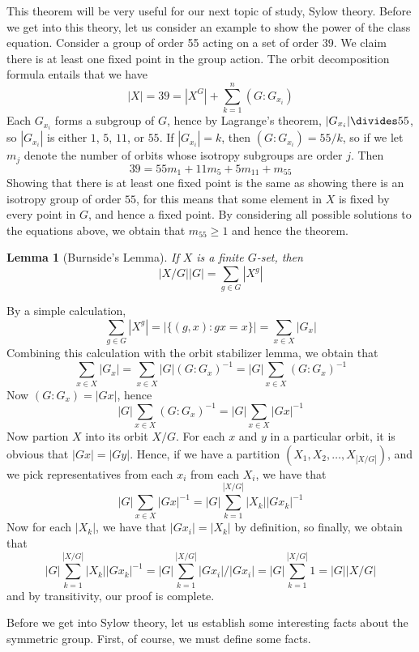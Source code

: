 \documentclass[12pt]{amsbook}
\makeatletter
\theoremstyle{plain}
\newtheorem{lemma}[theorem]{Lemma}
\theoremstyle{definition}
\renewenvironment{proof}[1][\proofname]{\par
  \pushQED{\qed}%
  \normalfont \topsep6\p@\@plus6\p@\relax
  \list{}{\leftmargin=0em
          \rightmargin=\leftmargin
          \settowidth{\itemindent}{\itshape#1}%
          \labelwidth=\itemindent}

  \item[\hskip\labelsep
        \itshape
    #1\@addpunct{.}]\ignorespaces
}{%
  \popQED\endlist\@endpefalse
}
\makeatother
\begin{document}
This theorem will be very useful for our next topic of study, Sylow theory. Before we get into this theory, let us consider an example to show the power of the class equation. Consider a group of order 55 acting on a set of order 39. We claim there is at least one fixed point in the group action. The orbit decomposition formula entails that we have
%
\[ |X| = 39 = |X^G| + \sum_{k=1}^n (G:G_{x_i}) \]
%
Each $G_{x_i}$ forms a subgroup of $G$, hence by Lagrange's theorem, $|G_{x_i}| \divides 55$, so $|G_{x_i}|$ is either $1$, $5$, $11$, or $55$. If $|G_{x_i}| = k$, then $(G:G_{x_i}) = 55/k$, so if we let $m_j$ denote the number of orbits whose isotropy subgroups are order $j$. Then
%
\[ 39 = 55m_1 + 11m_5 + 5m_{11} + m_{55} \]
%
Showing that there is at least one fixed point is the same as showing there is an isotropy group of order $55$, for this means that some element in $X$ is fixed by every point in $G$, and hence a fixed point. By considering all possible solutions to the equations above, we obtain that $m_{55} \geq 1$ and hence the theorem.

\begin{lemma}[Burnside's Lemma] 
    If $X$ is a finite $G$-set, then
    \[ |X/G||G| = \sum_{g \in G} |X^g| \]
\end{lemma}
\begin{proof}
    By a simple calculation,
    \[ \sum_{g \in G} |X^g| = |\{(g,x): gx = x\}| = \sum_{x \in X} |G_x| \]
    Combining this calculation with the orbit stabilizer lemma, we obtain that
    \[ \sum_{x \in X} |G_x| = \sum_{x \in X} |G|(G:G_x)^{-1} = |G| \sum_{x \in X} (G:G_x)^{-1} \]
    Now $(G:G_x) = |Gx|$, hence
    \[ |G| \sum_{x \in X} (G:G_x)^{-1} = |G| \sum_{x \in X} |Gx|^{-1} \]
    Now partion $X$ into its orbit $X/G$. For each $x$ and $y$ in a particular orbit, it is obvious that $|Gx| = |Gy|$. Hence, if we have a partition $(X_1, X_2, \dots, X_{|X/G|})$, and we pick representatives from each $x_i$ from each $X_i$, we have that
    \[ |G| \sum_{x \in X} |Gx|^{-1} = |G| \sum_{k = 1}^{|X/G|} |X_k||Gx_k|^{-1} \]
    Now for each $|X_k|$, we have that $|Gx_i| = |X_k|$ by definition, so finally, we obtain that
    \[ |G| \sum_{k = 1}^{|X/G|} |X_k||Gx_k|^{-1} = |G| \sum_{k = 1}^{|X/G|} |Gx_i|/|Gx_i| = |G| \sum_{k = 1}^{|X/G|} 1 = |G||X/G| \]
    and by transitivity, our proof is complete.
\end{proof}

Before we get into Sylow theory, let us establish some interesting facts about the symmetric group. First, of course, we must define some facts.
\end{document}
